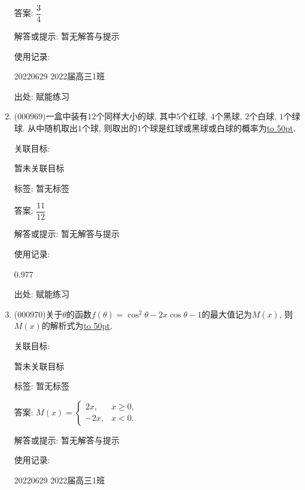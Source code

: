 \documentclass[10pt,a4paper]{article}
\newcommand{\blank}[1]{\underline{\hbox to #1pt{}}}
\begin{document}
\begin{enumerate}[1.]
答案: $\dfrac{3}{4}$

解答或提示: 暂无解答与提示

使用记录:

20220629    2022届高三1班  	


出处: 赋能练习
\item { (000969)}一盒中装有$12$个同样大小的球, 其中$5$个红球, $4$个黑球, $2$个白球, $1$个绿球. 从中随机取出$1$个球, 则取出的$1$个球是红球或黑球或白球的概率为\blank{50}.


关联目标:

暂未关联目标



标签: 暂无标签

答案: $\dfrac{11}{12}$

解答或提示: 暂无解答与提示

使用记录:

0.977


出处: 赋能练习
\item { (000970)}关于$\theta$的函数$f(\theta)=\cos^2\theta-2x\cos\theta-1$的最大值记为$M(x)$, 则$M(x)$的解析式为\blank{50}.


关联目标:

暂未关联目标



标签: 暂无标签

答案: $M(x)=\begin{cases} 2x, & x\ge 0, \\ -2x, & x<0.\end{cases}$

解答或提示: 暂无解答与提示

使用记录:

20220629    2022届高三1班  	



\end{enumerate}
\end{document}
